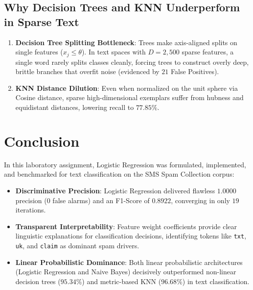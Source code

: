 \documentclass[12pt]{article}
\begin{document}
\subsection{Why Decision Trees and KNN Underperform in Sparse Text}
\begin{enumerate}
    \item \textbf{Decision Tree Splitting Bottleneck}: Trees make axis-aligned splits on single features ($x_j \le \theta$). In text spaces with $D = 2,500$ sparse features, a single word rarely splits classes cleanly, forcing trees to construct overly deep, brittle branches that overfit noise (evidenced by $21$ False Positives).
    \item \textbf{KNN Distance Dilution}: Even when normalized on the unit sphere via Cosine distance, sparse high-dimensional exemplars suffer from hubness and equidistant distances, lowering recall to $77.85\%$.
\end{enumerate}

\section{Conclusion}
In this laboratory assignment, Logistic Regression was formulated, implemented, and benchmarked for text classification on the SMS Spam Collection corpus:
\begin{itemize}
    \item \textbf{Discriminative Precision}: Logistic Regression delivered flawless $1.0000$ precision ($0$ false alarms) and an F1-Score of $0.8922$, converging in only $19$ iterations.
    \item \textbf{Transparent Interpretability}: Feature weight coefficients provide clear linguistic explanations for classification decisions, identifying tokens like \texttt{txt}, \texttt{uk}, and \texttt{claim} as dominant spam drivers.
    \item \textbf{Linear Probabilistic Dominance}: Both linear probabilistic architectures (Logistic Regression and Naive Bayes) decisively outperformed non-linear decision trees ($95.34\%$) and metric-based KNN ($96.68\%$) in text classification.
\end{itemize}
\end{document}
